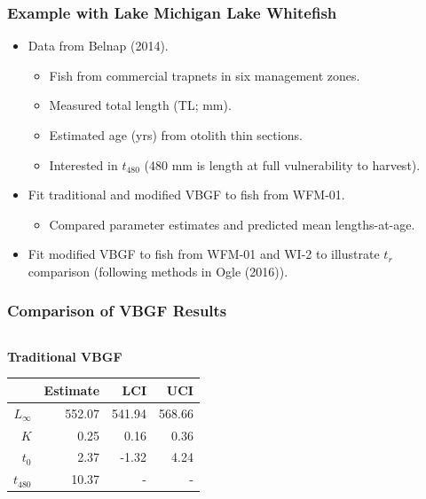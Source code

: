 \documentclass[xcolor=dvipsnames]{beamer}\usepackage[]{graphicx}\usepackage[]{color}
\begin{document}
\begin{frame}[fragile, t]
\frametitle{Example with Lake Michigan Lake Whitefish}
\begin{itemize}
  \item Data from Belnap (2014).\footnotemark
  \begin{itemize}
    \item Fish from commercial trapnets in six management zones.
    \item Measured total length (TL; mm).
    \item Estimated age (yrs) from otolith thin sections.
    \item Interested in $t_{480}$ (480 mm is length at full vulnerability to harvest).
  \end{itemize}
  \pause
  \bigskip
  \item Fit traditional and modified VBGF to fish from WFM-01.
  \begin{itemize}
    \item Compared parameter estimates and predicted mean lengths-at-age.
  \end{itemize}
  \pause
  \smallskip
  \item Fit modified VBGF to fish from WFM-01 and WI-2 to illustrate $t_{r}$ comparison (following methods in Ogle (2016)\footnotemark).
\end{itemize}
\end{frame}


\begin{frame}[fragile, t]
\frametitle{Comparison of VBGF Results}
\begin{columns}
\begin{column}{0.5\textwidth}
\textbf{Traditional VBGF}
\begin{table}[ht]
\centering
\begin{tabular}{rrrr}
  \hline
 & Estimate & LCI & UCI \\ 
  \hline
$L_{\infty}$ & 552.07 & 541.94 & 568.66 \\ 
  $K$ & 0.25 & 0.16 & 0.36 \\ 
  $t_{0}$ & 2.37 & -1.32 & 4.24 \\ 
  $t_{480}$ & 10.37 & - & - \\ 
   \hline
\end{tabular}
\end{table}

\end{column}
\begin{column}{0.5\textwidth}
\end{column}
\end{columns}
\end{frame}
\end{document}
